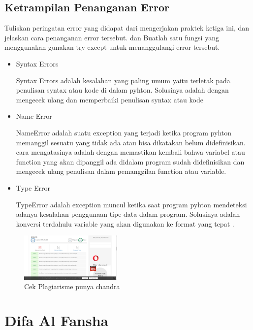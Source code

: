 \subsection{Ketrampilan Penanganan Error}
Tuliskan peringatan error yang didapat dari mengerjakan praktek ketiga ini, dan jelaskan cara penanganan error tersebut. dan Buatlah satu fungsi yang menggunakan gunakan try except untuk menanggulangi error tersebut.
\begin{itemize}
\item Syntax Errors

Syntax Errors adalah kesalahan yang paling umum yaitu terletak pada penulisan syntax atau kode di dalam pyhton. Solusinya adalah dengan mengecek ulang dan memperbaiki penulisan syntax atau kode	

\item Name Error

NameError adalah suatu exception yang terjadi ketika program pyhton memanggil sesuatu yang tidak ada atau bisa dikatakan belum didefinisikan. cara mengatasinya adalah dengan memastikan kembali bahwa variabel atau function yang akan dipanggil ada didalam program sudah didefinisikan dan mengecek ulang penulisan dalam pemanggilan function atau variable.

\item Type Error

TypeError adalah exception muncul ketika saat program pyhton mendeteksi adanya kesalahan penggunaan tipe data dalam program. Solusinya adalah konversi terdahulu variable yang akan digunakan ke format yang tepat .

\end{itemize}

\begin{figure}[ht!]
	\includegraphics[width=5cm]{figures/5/1174079/plagiarisme_praktek.png}
	\centering
	\caption{Cek Plagiarisme punya chandra}
\end{figure}
\section{Difa Al Fansha}
